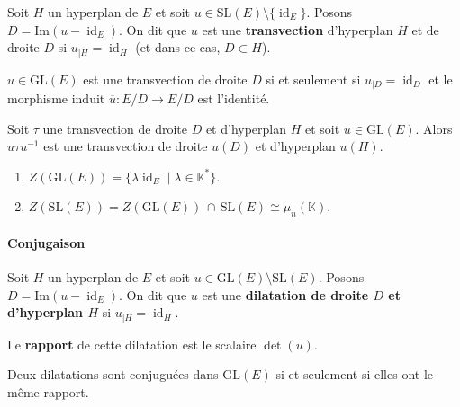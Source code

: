 
	\begin{definition}
		Soit $H$ un hyperplan de $E$ et soit $u \in \mathrm{SL}(E) \setminus \{ \operatorname{id}_E \}$. Posons $D = \mathrm{Im}(u - \operatorname{id}_E)$. On dit que $u$ est une \textbf{transvection} d'hyperplan $H$ et de droite $D$ si $u_{|H} = \operatorname{id}_H$ (et dans ce cas, $D \subset H$).
	\end{definition}

	\begin{proposition}
		$u \in \mathrm{GL}(E)$ est une transvection de droite $D$ si et seulement si $u_{|D} = \operatorname{id}_D$ et le morphisme induit $\overline{u} : E/D \rightarrow E/D$ est l'identité.
	\end{proposition}

	\begin{proposition}
		Soit $\tau$ une transvection de droite $D$ et d'hyperplan $H$ et soit $u \in \mathrm{GL}(E)$. Alors $u \tau u^{-1}$ est une transvection de droite $u(D)$ et d'hyperplan $u(H)$.
	\end{proposition}

	\begin{corollary}
		\begin{enumerate}[label=(\roman*)]
			\item $Z(\mathrm{GL}(E)) = \{ \lambda \operatorname{id}_E \mid \lambda \in \mathbb{K}^* \}$.
			\item $Z(\mathrm{SL}(E)) = Z(\mathrm{GL}(E)) \, \cap \, \mathrm{SL}(E) \cong \mu_n(\mathbb{K})$.
		\end{enumerate}
	\end{corollary}

	\paragraph{Conjugaison}

	\begin{definition}
		Soit $H$ un hyperplan de $E$ et soit $u \in \mathrm{GL}(E) \setminus \mathrm{SL}(E)$. Posons $D = \mathrm{Im}(u - \operatorname{id}_E)$. On dit que $u$ est une \textbf{dilatation de droite $D$ et d'hyperplan $H$} si $u_{|H} = \operatorname{id}_H$.

		\medskip
		Le \textbf{rapport} de cette dilatation est le scalaire $\det(u)$.
	\end{definition}

	\begin{proposition}
		Deux dilatations sont conjuguées dans $\mathrm{GL}(E)$ si et seulement si elles ont le même rapport.
	\end{proposition}

